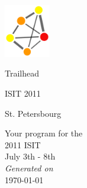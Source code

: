 \documentclass[a5paper,twoside]{article}
\newcommand{\mytitle}[1]{\Large \LARGE #1\par}
\newcommand{\mysubtitle}[1]{\large #1\par}
\newcommand{\mydate}[1]{\small #1\par}
\begin{document}
\begin{center}

\noindent%
\begin{minipage}[t]{.25\textwidth}
\vspace{0pt}\includegraphics[width=2cm]{img/logo/logo.png}
\end{minipage}%
\begin{minipage}[t]{.5\textwidth}
\vspace{16pt}
\vfill
\mytitle{Trailhead}
\mysubtitle{ISIT 2011}
\mydate{St. Petersbourg}
\end{minipage}

\Large
\vfill
Your program for the\\
2011 ISIT\\
July 3th - 8th\\
\vfill
\vfill
\small {\itshape Generated on}\\
\small \today
\end{center}
\thispagestyle{empty}\null\clearpage\setcounter{page}{1}
\end{document}
